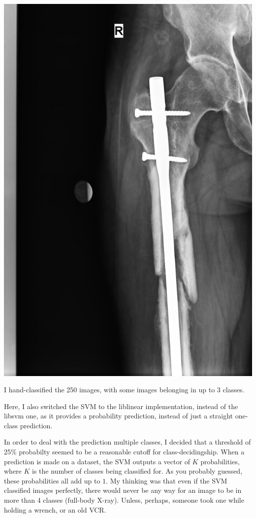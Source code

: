 \documentclass[12pt]{article}
\begin{document}
\includegraphics[scale=0.14]{../figures/leg-bolt.png}

\vspace{0.2in}

I hand-classified the 250 images, with some images belonging in up to 3 classes.

Here, I also switched the SVM to the liblinear implementation, instead of the
libsvm one, as it provides a probability prediction, instead of just a straight
one-class prediction.

In order to deal with the prediction multiple classes, I decided that a threshold
of 25\% probabilty seemed to be a reasonable cutoff for class-decidingship. When
a prediction is made on a dataset, the SVM outputs a vector of $K$ probabilities,
where $K$ is the number of classes being classified for. As you probably guessed,
these probabilities all add up to $1$. My thinking was that even if the SVM classified
images perfectly, there would never be any way for an image to be in more than 4
classes (full-body X-ray). Unless, perhaps, someone took one while holding a wrench,
or an old VCR.
\end{document}
